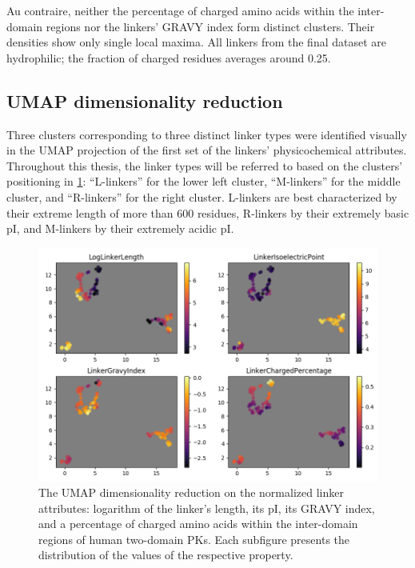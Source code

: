 		Au contraire, neither the percentage of charged amino acids within the inter-domain
		regions nor the linkers' GRAVY index form distinct clusters.
		Their densities show only single local maxima.
		All linkers from the final dataset are hydrophilic; the fraction of charged residues
		averages around 0.25.

	\subsection{UMAP dimensionality reduction}
	\label{res:first:umap}

		Three clusters corresponding to three distinct linker types were identified visually
		in the UMAP projection of the first set of the linkers' physicochemical attributes.
		Throughout this thesis, the linker types will be referred to based on the clusters'
		positioning in \cref{fig:umap}: ``L-linkers'' for the lower left cluster,
		``M-linkers'' for the middle cluster, and ``R-linkers'' for the right cluster.
		L-linkers are best characterized by their extreme length of more than 600 residues,
		R-linkers by their extremely basic pI, and M-linkers by their extremely acidic pI.

		\begin{figure}
			\centering
			\includegraphics[width=\linewidth]{img/linker_umap.png}
			\caption{The UMAP dimensionality reduction on the normalized linker attributes:
			logarithm of the linker's length, its pI, its GRAVY index, and
			a percentage of charged amino acids within the inter-domain regions of human
			two-domain PKs.
			Each subfigure presents the distribution of the values of the respective property.}
			\label{fig:umap}
		\end{figure}

